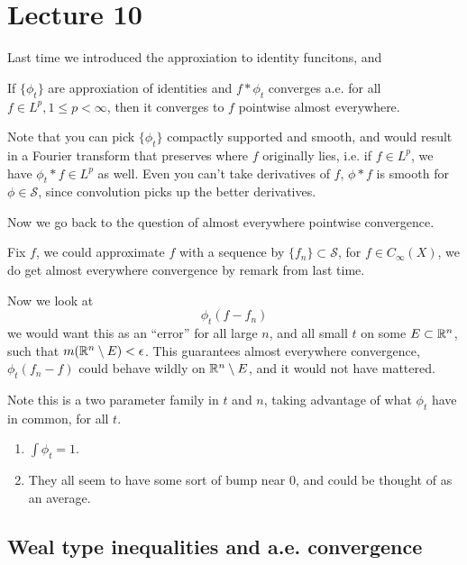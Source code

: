 \section{Lecture 10}
Last time we introduced the approxiation to identity funcitons, and 
\begin{exercise}
    If $\{\phi_t\}$ are approxiation of identities and $f\ast \phi_t$ converges a.e. for all $f\in L^p, 1\leq p<\infty$, then it converges to $f$ pointwise almost everywhere.
\end{exercise}
\begin{remark}
    Note that you can pick $\{\phi_t\}$ compactly supported and smooth, and would result in a Fourier transform that preserves where $f$ originally lies, i.e. if $f\in L^p$, we have $\phi_t\ast f\in L^p$ as well. Even you can't take derivatives of $f$, $\phi\ast f$ is smooth for $\phi\in\mathcal{S}$, since convolution picks up the better derivatives.
\end{remark}

Now we go back to the question of almost everywhere pointwise convergence.

Fix $f$, we could approximate $f$ with a sequence by $\{f_n\}\subset\mathcal{S}$, for $f\in C_\infty(X)$, we do get almost everywhere convergence by remark from last time.

Now we look at
\begin{equation*}
    \phi_t(f-f_n)
\end{equation*}
we would want this as an ``error'' for all large $n$, and all small $t$ on some $E\subset\mathbb{R}^n$, such that $m(\mathbb{R}^n\setminus E)<\epsilon$. This guarantees almost everywhere convergence, $\phi_t(f_n-f)$ could behave wildly on $\mathbb{R}^n\setminus E$, and it would not have mattered.

Note this is a two parameter family in $t$ and $n$, taking advantage of what $\phi_t$ have in common, for all $t$.

\begin{enumerate}
    \item $\int \phi_t=1$.
    \item They all seem to have some sort of bump near 0, and could be thought of as an average.
\end{enumerate}

\subsection{Weal type inequalities and a.e. convergence}


